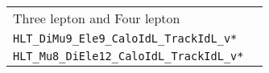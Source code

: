 \begin{table}
\centering \footnotesize
\begin{tabular}{ll}
Three lepton and Four lepton\\
\verb|HLT_DiMu9_Ele9_CaloIdL_TrackIdL_v*|\\
\verb|HLT_Mu8_DiEle12_CaloIdL_TrackIdL_v*|\\

\end{tabular}
\end{table}
